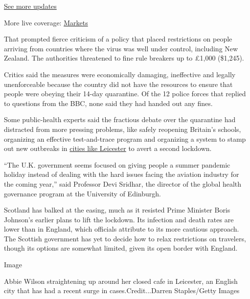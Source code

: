 \href{https://www.nytimes3xbfgragh.onion/2020/08/21/world/covid-19-coronavirus.html?action=click\&pgtype=Article\&state=default\&region=MAIN_CONTENT_1\&context=storylines_live_updates}{See
more updates}

More live coverage:
\href{https://www.nytimes3xbfgragh.onion/live/2020/08/20/business/stock-market-today-coronavirus?action=click\&pgtype=Article\&state=default\&region=MAIN_CONTENT_1\&context=storylines_live_updates}{Markets}

That prompted fierce criticism of a policy that placed restrictions on
people arriving from countries where the virus was well under control,
including New Zealand. The authorities threatened to fine rule breakers
up to £1,000 (\$1,245).

Critics said the measures were economically damaging, ineffective and
legally unenforceable because the country did not have the resources to
ensure that people were obeying their 14-day quarantine. Of the 12
police forces that replied to questions from the BBC, none said they had
handed out any fines.

Some public-health experts said the fractious debate over the quarantine
had distracted from more pressing problems, like safely reopening
Britain's schools, organizing an effective test-and-trace program and
organizing a system to stamp out new outbreaks in
\href{https://www.theguardian.com/uk-news/2020/jul/01/leicester-outbreak-driven-by-infection-rise-in-under-19s-says-phe-report}{cities
like Leicester} to avert a second lockdown.

``The U.K. government seems focused on giving people a summer pandemic
holiday instead of dealing with the hard issues facing the aviation
industry for the coming year,'' said Professor Devi Sridhar, the
director of the global health governance program at the University of
Edinburgh.

Scotland has balked at the easing, much as it resisted Prime Minister
Boris Johnson's earlier plans to lift the lockdown. Its infection and
death rates are lower than in England, which officials attribute to its
more cautious approach. The Scottish government has yet to decide how to
relax restrictions on travelers, though its options are somewhat
limited, given its open border with England.

Image

Abbie Wilson straightening up around her closed cafe in Leicester, an
English city that has had a recent surge in cases.Credit...Darren
Staples/Getty Images

